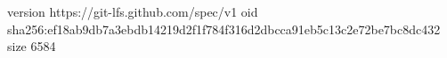 version https://git-lfs.github.com/spec/v1
oid sha256:ef18ab9db7a3ebdb14219d2f1f784f316d2dbcca91eb5c13c2e72be7bc8dc432
size 6584
